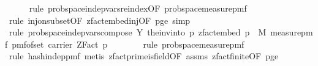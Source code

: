 \begin{isabellebody}
\ \ \ \ \isamarkupfalse%
\ {\isacharparenleft}{\kern0pt}rule\ prob{\isacharunderscore}{\kern0pt}space{\isachardot}{\kern0pt}indep{\isacharunderscore}{\kern0pt}vars{\isacharunderscore}{\kern0pt}reindex{\isacharbrackleft}{\kern0pt}OF\ prob{\isacharunderscore}{\kern0pt}space{\isacharunderscore}{\kern0pt}measure{\isacharunderscore}{\kern0pt}pmf{\isacharbrackright}{\kern0pt}{\isacharparenright}{\kern0pt}\isanewline
\ \ \ \ \ \isamarkupfalse%
\ {\isacharparenleft}{\kern0pt}rule\ inj{\isacharunderscore}{\kern0pt}on{\isacharunderscore}{\kern0pt}subset{\isacharbrackleft}{\kern0pt}OF\ zfact{\isacharunderscore}{\kern0pt}embed{\isacharunderscore}{\kern0pt}inj{\isacharbrackleft}{\kern0pt}OF\ p{\isacharunderscore}{\kern0pt}ge{\isacharunderscore}{\kern0pt}{}{\isacharbrackright}{\kern0pt}{\isacharbrackright}{\kern0pt}{\isacharcomma}{\kern0pt}\ simp{\isacharparenright}{\kern0pt}\isanewline
\ \ \ \ \isamarkupfalse%
\ {\isacharparenleft}{\kern0pt}rule\ prob{\isacharunderscore}{\kern0pt}space{\isachardot}{\kern0pt}indep{\isacharunderscore}{\kern0pt}vars{\isacharunderscore}{\kern0pt}compose{}{\isacharbrackleft}{\kern0pt}\ Y{\isacharequal}{\kern0pt}{\isachardoublequoteopen}{\isasymlambda}{\isacharunderscore}{\kern0pt}{\isachardot}{\kern0pt}\ the{\isacharunderscore}{\kern0pt}inv{\isacharunderscore}{\kern0pt}into\ {\isacharbraceleft}{\kern0pt}{}{\isachardot}{\kern0pt}{\isachardot}{\kern0pt}{\isacharless}{\kern0pt}p{\isacharbraceright}{\kern0pt}\ {\isacharparenleft}{\kern0pt}zfact{\isacharunderscore}{\kern0pt}embed\ p{\isacharparenright}{\kern0pt}{\isachardoublequoteclose}\ \ M{\isacharprime}{\kern0pt}{\isacharequal}{\kern0pt}{\isachardoublequoteopen}{\isasymlambda}{\isacharunderscore}{\kern0pt}{\isachardot}{\kern0pt}\ measure{\isacharunderscore}{\kern0pt}pmf\ {\isacharparenleft}{\kern0pt}pmf{\isacharunderscore}{\kern0pt}of{\isacharunderscore}{\kern0pt}set\ {\isacharparenleft}{\kern0pt}carrier\ {\isacharparenleft}{\kern0pt}ZFact\ p{\isacharparenright}{\kern0pt}{\isacharparenright}{\kern0pt}{\isacharparenright}{\kern0pt}{\isachardoublequoteclose}{\isacharbrackright}{\kern0pt}{\isacharparenright}{\kern0pt}\isanewline
\ \ \ \ \ \ \isamarkupfalse%
\ {\isacharparenleft}{\kern0pt}rule\ prob{\isacharunderscore}{\kern0pt}space{\isacharunderscore}{\kern0pt}measure{\isacharunderscore}{\kern0pt}pmf{\isacharparenright}{\kern0pt}\isanewline
\ \ \ \ \ \isamarkupfalse%
\ {\isacharparenleft}{\kern0pt}rule\ hash{\isacharunderscore}{\kern0pt}indep{\isacharunderscore}{\kern0pt}pmf{\isacharcomma}{\kern0pt}\ metis\ zfact{\isacharunderscore}{\kern0pt}prime{\isacharunderscore}{\kern0pt}is{\isacharunderscore}{\kern0pt}field{\isacharbrackleft}{\kern0pt}OF\ assms{\isacharparenleft}{\kern0pt}{}{\isacharparenright}{\kern0pt}{\isacharbrackright}{\kern0pt}\ zfact{\isacharunderscore}{\kern0pt}finite{\isacharbrackleft}{\kern0pt}OF\ p{\isacharunderscore}{\kern0pt}ge{\isacharunderscore}{\kern0pt}{}{\isacharbrackright}{\kern0pt}{\isacharparenright}{\kern0pt}\isanewline

\end{isabellebody}
